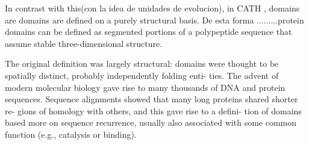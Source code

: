 In contrast with this(con la idea de unidades de evolucion), in CATH \cite{orengo1997cath}, domains are domains are defined on a purely structural basis.
De esta forma .........protein domains can be defined as segmented portions of a polypeptide sequence that assume stable three-dimensional structure.

The original definition was largely structural: domains were thought
to be spatially distinct, probably independently folding enti-
ties. The advent of modern molecular biology gave rise to
many thousands of DNA and protein sequences. Sequence
alignments showed that many long proteins shared shorter re-
gions of homology with others, and this gave rise to a defini-
tion of domains based more on sequence recurrence, usually
also associated with some common function (e.g., catalysis
or binding). 








